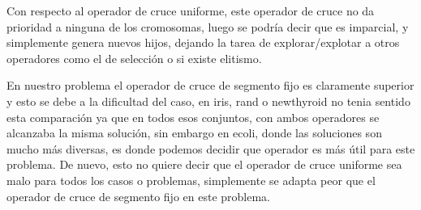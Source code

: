 \documentclass[12pt, spanish]{article}
\begin{document}
Con respecto al operador de cruce uniforme, este operador de cruce no da prioridad a ninguna de los cromosomas, luego se podría decir que es imparcial, y simplemente genera nuevos hijos, dejando la tarea de explorar/explotar a otros operadores como el de selección o si existe elitismo.

En nuestro problema el operador de cruce de segmento fijo es claramente superior y esto se debe a la dificultad del caso, en iris, rand o newthyroid no tenia sentido esta comparación ya que en todos esos conjuntos, con ambos operadores se alcanzaba la misma solución, sin embargo en ecoli, donde las soluciones son mucho más diversas, es donde podemos decidir que operador es más útil para este problema. De nuevo, esto no quiere decir que el operador de cruce uniforme sea malo para todos los casos o problemas, simplemente se adapta peor que el operador de cruce de segmento fijo en este problema.
\end{document}
